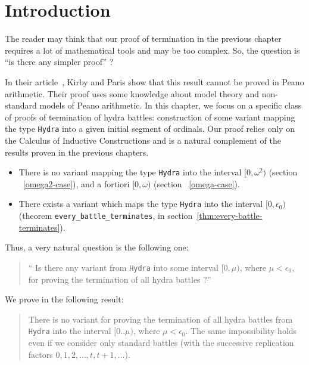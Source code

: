 \section{Introduction}
The reader may think that our proof of termination in the previous  chapter requires a lot of mathematical tools and may be too  complex. So, the question is ``is there  any  simpler proof'' ?

In their article~\cite{KP82}, Kirby and Paris show that this result cannot be proved in Peano arithmetic. Their proof uses some knowledge about model theory and non-standard models of Peano arithmetic. In this chapter, we focus on a specific class of proofs of termination of hydra battles: construction of some variant mapping the type \texttt{Hydra} into a given initial  segment of ordinals. Our proof relies only on the Calculus of Inductive Constructions and is a natural complement of the results proven in the previous chapters.

\begin{itemize}
\item There is no variant mapping the type \texttt{Hydra} into the interval $[0,\omega^2)$ (section ~\vref{omega2-case}), and a fortiori 
$[0,\omega)$ (section ~\vref{omega-case}).

\item There exists a variant which maps the type \texttt{Hydra} into the
interval $[0,\epsilon_0)$ (theorem \texttt{every\_battle\_terminates}, in section~\vref{thm:every-battle-terminates}).
\end{itemize}


Thus, a very natural question is the following one:
\begin{quote}
  `` Is there  any variant from
\texttt{Hydra} into some interval $[0,\mu)$, where $\mu<\epsilon_0$, for proving the termination of all hydra battles ?''
\end{quote}

We prove in \coq{} the following result:

\begin{quote}
There is no variant for proving the termination of all hydra battles
from \texttt{Hydra} into the interval $[0..\mu)$, where
$\mu< \epsilon_0$.
The same impossibility holds even if we consider only standard battles (with the successive replication factors $0,1,2,\dots,t,t+1,\dots$).
\end{quote}

